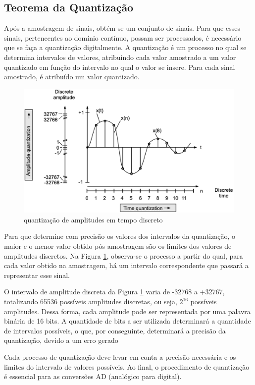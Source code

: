 \subsection{Teorema da Quantização}

Após a amostragem de sinais, obtém-se um conjunto de sinais. Para que esses sinais, pertencentes ao domínio contínuo, possam ser processados, é necessário que se faça a quantização digitalmente. A quantização é um processo no qual se determina intervalos de valores, atribuindo cada valor amostrado a um valor quantizado em função do intervalo no qual o valor se insere. Para cada sinal amostrado, é atribuído um valor quantizado.

\begin{figure}[h]
	\centering
    \includegraphics[scale=0.4]{figuras/fig04.eps}
	\caption{quantização de amplitudes em tempo discreto \cite{oppenheim2010sinais}}
	\label{fig04}
\end{figure}

Para que determine com precisão os valores dos intervalos da quantização, o maior e o menor valor obtido pós amostragem são os limites dos valores de amplitudes discretos. Na Figura \ref{fig04}, observa-se o processo a partir do qual, para cada valor obtido na amostragem, há um intervalo correspondente que passará a representar esse sinal.
\par O intervalo de amplitude discreta da Figura \ref{fig04} varia de -32768 a +32767, totalizando 65536 possíveis amplitudes discretas, ou seja, $2^{16}$ possíveis amplitudes. Dessa forma, cada amplitude pode ser representada por uma palavra binária de 16 bits. A quantidade de bits a ser utilizada determinará a quantidade de intervalos possíveis, o que, por conseguinte, determinará a precisão da quantização, devido a um erro gerado
\par Cada processo de quantização deve levar em conta a precisão necessária e os limites do intervalo de valores possíveis. Ao final, o procedimento de quantização é essencial para as conversões AD (analógico para digital).

